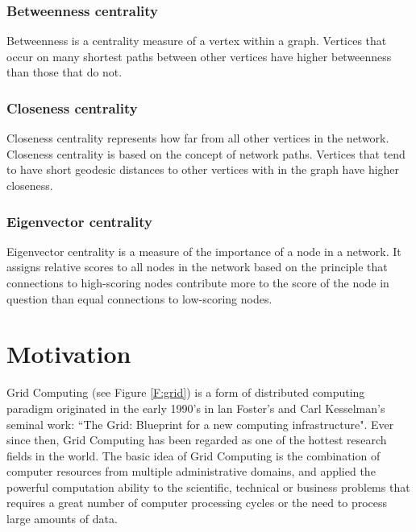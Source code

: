 \subsubsection{Betweenness centrality}
Betweenness is a centrality measure of a vertex within a graph. Vertices that occur on many shortest paths between other vertices have higher betweenness than those that do not.
\subsubsection{Closeness centrality}
Closeness centrality represents how far from all other vertices in the network. Closeness centrality is based on the concept of network paths. Vertices that tend to have short geodesic distances to other vertices with in the graph have higher closeness.
\subsubsection{Eigenvector centrality}
Eigenvector centrality is a measure of the importance of a node in a network. It assigns relative scores to all nodes in the network based on the principle that connections to high-scoring nodes contribute more to the score of the node in question than equal connections to low-scoring nodes.

\section{Motivation \label{S:Motivation}}
Grid Computing (see Figure \ref{F:grid}) is a form of distributed computing paradigm originated in the early 1990's in lan Foster's and Carl Kesselman's seminal work: ``The Grid: Blueprint for a new computing infrastructure". Ever since then, Grid Computing has been regarded as one of the hottest research fields in the world. The basic idea of Grid Computing is the combination of computer resources from multiple administrative domains, and applied the powerful computation ability to the scientific, technical or business problems that requires a great number of computer processing cycles or the need to process large amounts of data.

